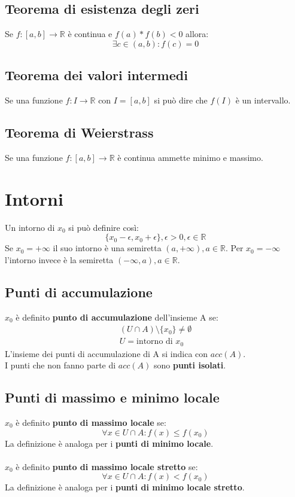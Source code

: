 \documentclass[12pt,a4paper]{article}
\let\oldsection\section
\renewcommand{\section}{\clearpage\oldsection}
\begin{document}
\subsection{Teorema di esistenza degli zeri}
Se $f:[a,b] \rightarrow \mathbb{R}$ è continua e $f(a) * f(b) < 0$ allora:
\[
\exists c \in (a,b) : f(c) = 0
\]
\subsection{Teorema dei valori intermedi}
Se una funzione $f:I \rightarrow \mathbb{R}$ con $I = [a,b]$ si può dire che $f(I)$ è un intervallo.

\subsection{Teorema di Weierstrass}
Se una funzione $f:[a,b] \rightarrow \mathbb{R}$ è continua ammette minimo e massimo.

\section{Intorni}
Un intorno di $x_0$ si può definire così:
\[
\{x_0 - \epsilon, x_0 + \epsilon\}, \epsilon > 0, \epsilon \in \mathbb{R}
\]
Se $x_0 = +\infty$ il suo intorno è una semiretta $(a,+\infty), a \in \mathbb{R}$.
Per $x_0 = -\infty$ l'intorno invece è la semiretta $(-\infty, a), a \in \mathbb{R}$.

\subsection{Punti di accumulazione}
$x_0$ è definito \textbf{punto di accumulazione} dell'insieme A se:
\begin{align*}
    (U \cap A) \setminus \{x_0\} \ne \emptyset \\ 
    U = \text{intorno di } x_0
\end{align*}
L'insieme dei punti di accumulazione di A si indica con $acc(A)$.\\
I punti che non fanno parte di $acc(A)$ sono \textbf{punti isolati}.

\subsection{Punti di massimo e minimo locale}
$x_0$ è definito \textbf{punto di massimo locale} se:
\[
\forall x \in U \cap A : f(x) \le f(x_0)
\]
La definizione è analoga per i \textbf{punti di minimo locale}.\\\\
$x_0$ è definito \textbf{punto di massimo locale stretto} se:
\[
\forall x \in U \cap A : f(x) < f(x_0)
\]
La definizione è analoga per i \textbf{punti di minimo locale stretto}.
\end{document}

